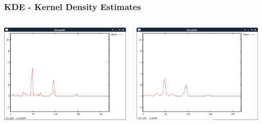 \documentclass{beamer}
\begin{document}
\begin{frame}
\frametitle{KDE - Kernel Density Estimates}
\begin{columns}
\begin{column}{0.5\textwidth}
\includegraphics[scale=0.25]{kde2}
\end{column}
\begin{column}{0.5\textwidth}
\includegraphics[scale=0.25]{kde3}
\end{column}
\end{columns}
\end{frame}
\end{document}
